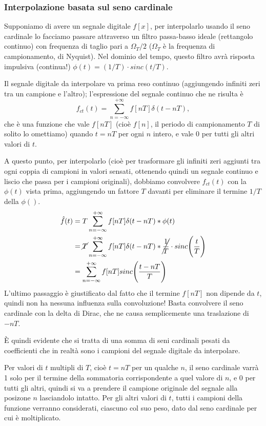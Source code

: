 \documentclass[a4paper,11pt]{article}
\begin{document}
\subsubsection{Interpolazione basata sul seno cardinale}
Supponiamo di avere un segnale digitale $f[x]$, per interpolarlo usando il seno cardinale lo facciamo passare attraverso un filtro passa-basso ideale (rettangolo continuo)
con frequenza di taglio pari a $\Omega_T / 2$ ($\Omega_T$ è la frequenza di campionamento, di Nyquist). Nel dominio del tempo, questo filtro avrà risposta impulsiva (continua!)
$\phi(t) = (1/T) \cdot sinc(t/T)$.
\par
Il segnale digitale da interpolare va prima reso continuo (aggiungendo infiniti zeri tra un campione e l'altro); l'espressione del segnale continuo che ne risulta è
\[
f_{ct}(t) = \sum^{+\infty}_{n=-\infty} f[nT] \delta(t - nT),
\]
che è una funzione che vale $f[nT]$ (cioè $f[n]$, il periodo di campionamento $T$ di solito lo omettiamo) quando $t = nT$ per ogni $n$ intero, e vale 0 per tutti gli altri valori di $t$.
\par
A questo punto, per interpolarlo (cioè per trasformare gli infiniti zeri aggiunti tra ogni coppia di campioni in valori sensati, ottenendo quindi un segnale continuo e liscio che passa per i campioni originali),
dobbiamo convolvere $f_{ct}(t)$ con la $\phi(t)$ vista prima, aggiungendo un fattore $T$ davanti per eliminare il termine $1/T$ della $\phi()$.
\begin{align*}
    \hat{f}(t) &= T \sum^{+\infty}_{n=-\infty} f[nT] \delta(t - nT) \ast \phi(t) \\
    &= \cancel{T} \sum^{+\infty}_{n=-\infty} f[nT] \delta(t - nT) \ast \cancel{\frac{1}{T}} \cdot sinc\Bigg(\frac{t}{T}\Bigg) \\
    &= \sum^{+\infty}_{n=-\infty} f[nT] sinc\Bigg(\frac{t-nT}{T}\Bigg)
\end{align*}
L'ultimo passaggio è giustificato dal fatto che il termine $f[nT]$ non dipende da $t$, quindi non ha nessuna influenza sulla convoluzione! Basta convolvere il seno cardinale con la delta di Dirac, che ne causa
semplicemente una traslazione di $-nT$.
\par
È quindi evidente che si tratta di una somma di seni cardinali pesati da coefficienti che in realtà sono i campioni del segnale digitale da interpolare.
\par
Per valori di $t$ multipli di $T$, cioè $t = nT$ per un qualche $n$, il seno cardinale varrà 1 solo per il termine della sommatoria corrispondente a quel valore di $n$, e 0 per tutti gli altri,
quindi si va a prendere il campione originale del segnale alla posizone $n$ lasciandolo intatto. Per gli altri valori di $t$, tutti i campioni della
funzione verranno considerati, ciascuno col suo peso, dato dal seno cardinale per cui è moltiplicato.
\end{document}
